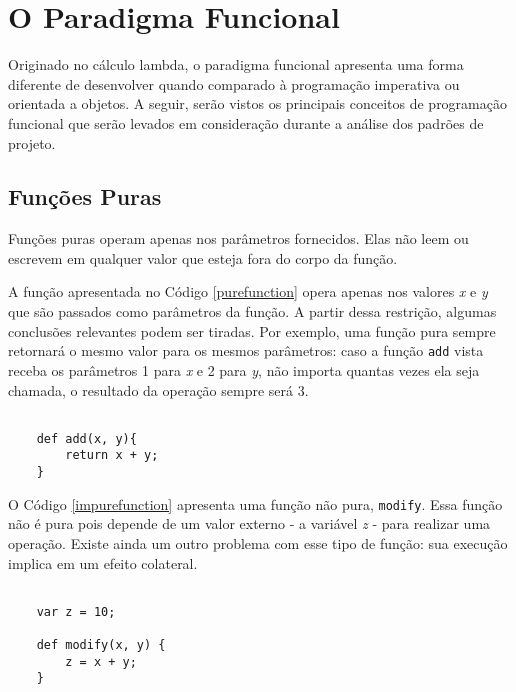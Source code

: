 \chapter{O Paradigma Funcional}

Originado no cálculo lambda, o paradigma funcional 
apresenta uma forma diferente de desenvolver quando 
comparado à programação imperativa ou orientada a 
objetos. A seguir, serão vistos os principais 
conceitos de programação funcional que serão 
levados em consideração durante a análise dos 
padrões de projeto.

\section{Funções Puras}

Funções puras operam apenas nos parâmetros fornecidos. 
Elas não leem ou escrevem em qualquer valor que esteja 
fora do corpo da função\cite{purefunctionscala, functionalscala}.

A função apresentada no Código \ref{purefunction} 
opera apenas nos valores \textit{x} e \textit{y} que 
são passados como parâmetros da função. A partir 
dessa restrição, algumas conclusões relevantes podem 
ser tiradas. Por exemplo, uma função pura sempre 
retornará o mesmo valor para os mesmos parâmetros: 
caso a função \texttt{add} vista receba os parâmetros 1 para 
\textit{x} e 2 para \textit{y}, não importa quantas vezes 
ela seja chamada, 
o resultado da operação sempre será 3\cite{functionalscala}.

\begin{lstlisting}[caption={Exemplo de Função Pura.},label=purefunction]

    def add(x, y){
        return x + y;
    }

\end{lstlisting}

O Código \ref{impurefunction} apresenta uma função 
não pura, \texttt{modify}. Essa função não é pura pois 
depende de um valor externo - a variável \textit{z} - para 
realizar uma operação. Existe ainda um outro problema 
com esse tipo de função: sua execução implica em 
um efeito colateral.

\begin{lstlisting}[caption={Exemplo de Função Impura.},label=impurefunction]

    var z = 10;

    def modify(x, y) {
        z = x + y;
    }

\end{lstlisting}

